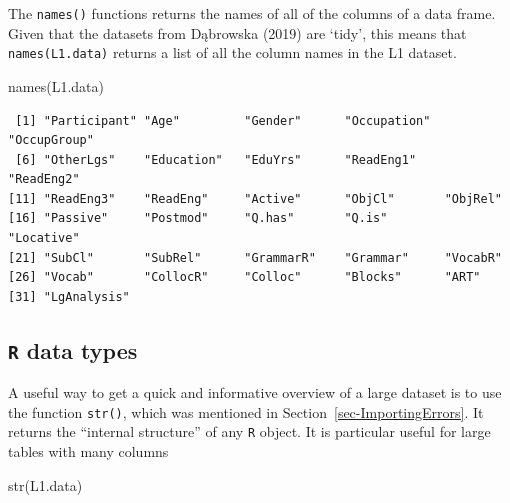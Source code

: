 \documentclass[
  letterpaper,
  DIV=11,
  numbers=noendperiod]{scrreprt}
\newenvironment{Shaded}{\begin{snugshade}}{\end{snugshade}}
\newcommand{\FunctionTok}[1]{\textcolor[rgb]{0.28,0.35,0.67}{#1}}
\newcommand{\NormalTok}[1]{\textcolor[rgb]{0.00,0.23,0.31}{#1}}
\begin{document}
The \texttt{names()} functions returns the names of all of the columns
of a data frame. Given that the datasets from Dąbrowska (2019) are
`tidy', this means that \texttt{names(L1.data)} returns a list of all
the column names in the L1 dataset.

\begin{Shaded}
\begin{Highlighting}[]
\FunctionTok{names}\NormalTok{(L1.data)}
\end{Highlighting}
\end{Shaded}

\begin{verbatim}
 [1] "Participant" "Age"         "Gender"      "Occupation"  "OccupGroup" 
 [6] "OtherLgs"    "Education"   "EduYrs"      "ReadEng1"    "ReadEng2"   
[11] "ReadEng3"    "ReadEng"     "Active"      "ObjCl"       "ObjRel"     
[16] "Passive"     "Postmod"     "Q.has"       "Q.is"        "Locative"   
[21] "SubCl"       "SubRel"      "GrammarR"    "Grammar"     "VocabR"     
[26] "Vocab"       "CollocR"     "Colloc"      "Blocks"      "ART"        
[31] "LgAnalysis" 
\end{verbatim}

\subsection{\texorpdfstring{\texttt{R} data
types}{R data types}}\label{sec-DataTypes}

A useful way to get a quick and informative overview of a large dataset
is to use the function \texttt{str()}, which was mentioned in
Section~\ref{sec-ImportingErrors}. It returns the ``internal structure''
of any \texttt{R} object. It is particular useful for large tables with
many columns

\begin{Shaded}
\begin{Highlighting}[]
\FunctionTok{str}\NormalTok{(L1.data)}
\end{Highlighting}
\end{Shaded}
\end{document}

